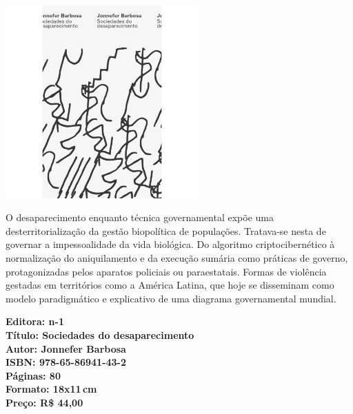 \begin{center}
\hspace*{.5cm}\includegraphics[width=74mm]{./CAPAS/N-1_BARBOSA.jpg}
\end{center}

\hspace*{-7cm}\hrulefill\hspace*{-7cm}

\medskip

\noindent{}O desaparecimento enquanto técnica governamental expõe uma desterritorialização da gestão biopolítica de populações. Tratava-se nesta de governar a impessoalidade da vida biológica.  Do algoritmo criptocibernético à normalização do aniquilamento e da execução sumária como práticas de governo, protagonizadas pelos aparatos policiais ou paraestatais.  Formas de violência gestadas em territórios como a América Latina, que hoje se disseminam como modelo paradigmático e explicativo de uma diagrama governamental mundial.

\vfill

\hspace*{-.4cm}\begin{minipage}[c]{1\linewidth}
\small\textbf{
\hspace*{-.1cm}Editora: n-1\\
Título: Sociedades do desaparecimento\\
Autor: Jonnefer Barbosa\\
ISBN: 978-65-86941-43-2\\
Páginas: 80\\
Formato: 18x11\,cm\\
Preço: R\$ 44,00\\
}
\end{minipage}

